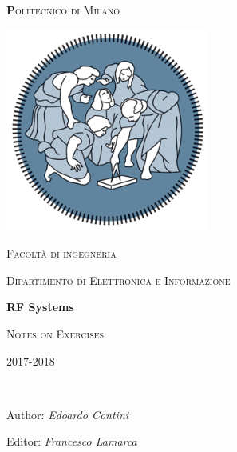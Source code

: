 \begin{titlepage}

	\centering
	{\scshape\Huge\textbf Politecnico di Milano \par}
	\vspace{0.5cm}

	\includegraphics[width=0.5\textwidth]{Immagini/logo.png}\par\vspace{0.2cm}

	{\scshape\small Facoltà di ingegneria\par}
	{\scshape\small Dipartimento di Elettronica e Informazione\par}
	\vspace{1.5cm}
	{\huge\bfseries RF Systems\par}
	\vspace{1.5cm}
	{\scshape Notes on Exercises\par}
	{\scshape\small 2017-2018 \par}
	\vspace{2cm}
	\vfill
    \\[1cm]

	\raggedright{Author: \textit{Edoardo Contini}}\\
    \vspace{0.1cm}
    \raggedright{Editor: \textit{Francesco Lamarca}
	}\vfill
	\end{titlepage}
